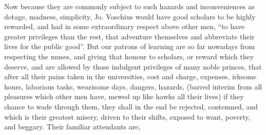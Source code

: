Now because they are commonly subject to such hazards and inconveniences as
dotage, madness, simplicity, \etc{} Jo. Voschius would have good scholars to be
highly rewarded, and had in some extraordinary respect above other men, \enquote{to
have greater privileges than the rest, that adventure
themselves and abbreviate their lives for the public good}. But our patrons of
learning are so far nowadays from respecting the muses, and giving that honour
to scholars, or reward which they deserve, and are allowed by those indulgent
privileges of many noble princes, that after all their pains taken in the
universities, cost and charge, expenses, irksome hours, laborious tasks,
wearisome days, dangers, hazards, (barred interim from all pleasures which
other men have, mewed up like hawks all their lives) if they chance to wade
through them, they shall in the end be rejected, contemned, and which is their
greatest misery, driven to their shifts, exposed to want, poverty, and beggary.
Their familiar attendants are,


